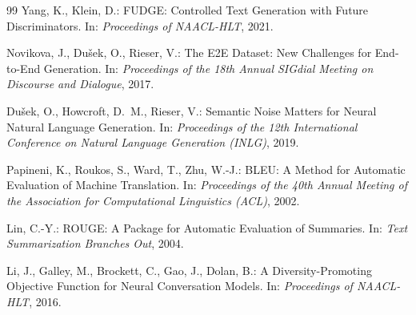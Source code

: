 \documentclass[11pt,a4paper]{article}
\begin{document}
\begin{thebibliography}{99}
Yang, K., Klein, D.:
\newblock FUDGE: Controlled Text Generation with Future Discriminators.
\newblock In: \emph{Proceedings of NAACL-HLT}, 2021.

Novikova, J., Du\v{s}ek, O., Rieser, V.:
\newblock The E2E Dataset: New Challenges for End-to-End Generation.
\newblock In: \emph{Proceedings of the 18th Annual SIGdial Meeting on Discourse and Dialogue}, 2017.

Du\v{s}ek, O., Howcroft, D.~M., Rieser, V.:
\newblock Semantic Noise Matters for Neural Natural Language Generation.
\newblock In: \emph{Proceedings of the 12th International Conference on Natural Language Generation (INLG)}, 2019.

Papineni, K., Roukos, S., Ward, T., Zhu, W.-J.:
\newblock BLEU: A Method for Automatic Evaluation of Machine Translation.
\newblock In: \emph{Proceedings of the 40th Annual Meeting of the Association for Computational Linguistics (ACL)}, 2002.

Lin, C.-Y.:
\newblock ROUGE: A Package for Automatic Evaluation of Summaries.
\newblock In: \emph{Text Summarization Branches Out}, 2004.

Li, J., Galley, M., Brockett, C., Gao, J., Dolan, B.:
\newblock A Diversity-Promoting Objective Function for Neural Conversation Models.
\newblock In: \emph{Proceedings of NAACL-HLT}, 2016.

\end{thebibliography}
\end{document}
